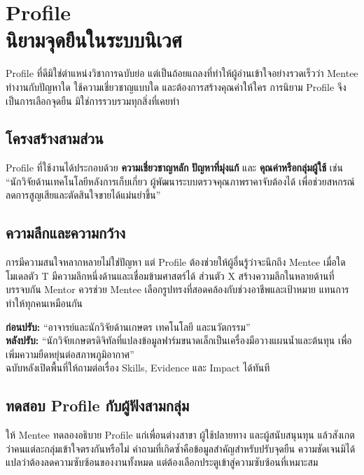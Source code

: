 \chapter{Profile\\นิยามจุดยืนในระบบนิเวศ}

Profile ที่ดีมิใช่ตำแหน่งวิชาการฉบับย่อ แต่เป็นถ้อยแถลงที่ทำให้ผู้อ่านเข้าใจอย่างรวดเร็วว่า Mentee ทำงานกับปัญหาใด ใช้ความเชี่ยวชาญแบบใด และต้องการสร้างคุณค่าให้ใคร การนิยาม Profile จึงเป็นการเลือกจุดยืน มิใช่การรวบรวมทุกสิ่งที่เคยทำ


\section{โครงสร้างสามส่วน}
Profile ที่ใช้งานได้ประกอบด้วย \textbf{ความเชี่ยวชาญหลัก} \textbf{ปัญหาที่มุ่งแก้} และ \textbf{คุณค่าหรือกลุ่มผู้ใช้} เช่น \enquote{นักวิจัยด้านเทคโนโลยีหลังการเก็บเกี่ยว ผู้พัฒนาระบบตรวจคุณภาพราคาจับต้องได้ เพื่อช่วยสหกรณ์ลดการสูญเสียและตัดสินใจขายได้แม่นยำขึ้น}

\section{ความลึกและความกว้าง}
การมีความสนใจหลากหลายไม่ใช่ปัญหา แต่ Profile ต้องช่วยให้ผู้อื่นรู้ว่าจะนึกถึง Mentee เมื่อใด โมเดลตัว T มีความลึกหนึ่งด้านและเชื่อมข้ามศาสตร์ได้ ส่วนตัว X สร้างความลึกในหลายด้านที่บรรจบกัน Mentor ควรช่วย Mentee เลือกรูปทรงที่สอดคล้องกับช่วงอาชีพและเป้าหมาย แทนการทำให้ทุกคนเหมือนกัน

\begin{examplebox}
\textbf{ก่อนปรับ:} \enquote{อาจารย์และนักวิจัยด้านเกษตร เทคโนโลยี และนวัตกรรม}\\
\textbf{หลังปรับ:} \enquote{นักวิจัยเกษตรดิจิทัลที่แปลงข้อมูลฟาร์มขนาดเล็กเป็นเครื่องมือวางแผนน้ำและต้นทุน เพื่อเพิ่มความยืดหยุ่นต่อสภาพภูมิอากาศ}\\
ฉบับหลังเปิดพื้นที่ให้ถามต่อเรื่อง Skills, Evidence และ Impact ได้ทันที
\end{examplebox}

\section{ทดสอบ Profile กับผู้ฟังสามกลุ่ม}
ให้ Mentee ทดลองอธิบาย Profile แก่เพื่อนต่างสาขา ผู้ใช้ปลายทาง และผู้สนับสนุนทุน แล้วสังเกตว่าคนแต่ละกลุ่มเข้าใจตรงกันหรือไม่ คำถามที่เกิดซ้ำคือข้อมูลสำคัญสำหรับปรับจุดยืน ความชัดเจนมิได้แปลว่าต้องลดความซับซ้อนของงานทั้งหมด แต่ต้องเลือกประตูเข้าสู่ความซับซ้อนที่เหมาะสม

